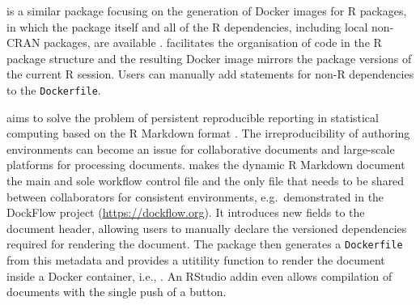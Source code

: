 \textbf{} is a similar package focusing on the generation
of Docker images for R packages, in which the package itself and all of
the R dependencies, including local non-CRAN packages, are available
\citep{cran_dockr,kjeldgaard_dockr_2019}.  facilitates the
organisation of code in the R package structure and the resulting Docker
image mirrors the package versions of the current R session. Users can
manually add statements for non-R dependencies to the
\texttt{Dockerfile}.

\textbf{} \citep{liftr2019} aims to solve the problem of
persistent reproducible reporting in statistical computing based on the
R Markdown format \citep{xie2018}. The irreproducibility of authoring
environments can become an issue for collaborative documents and
large-scale platforms for processing documents.  makes the
dynamic R Markdown document the main and sole workflow control file and
the only file that needs to be shared between collaborators for
consistent environments, e.g.~demonstrated in the DockFlow project
(\url{https://dockflow.org}). It introduces new fields to the document
header, allowing users to manually declare the versioned dependencies
required for rendering the document. The package then generates a
\texttt{Dockerfile} from this metadata and provides a utitility function
to render the document inside a Docker container, i.e.,
. An RStudio addin even allows
compilation of documents with the single push of a button.

